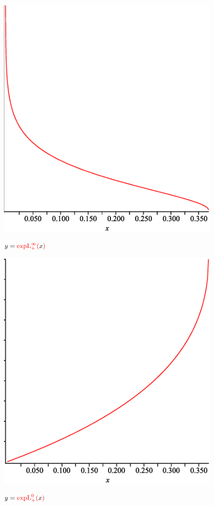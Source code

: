 \documentclass[12pt,reqno,intlimits,twoside]{amsart}
\DeclareMathOperator{\expL}{expL}%
\begin{document}
\begin{figure}[!h]
  \includegraphics{ExpLinPosInfinity}\\
  \caption{$y=\textcolor{red}{\expL_+^{\infty}(}x\textcolor{red}{)}$}\label{FigExpLinPosInfinity}
\end{figure}

\newpage

\begin{figure}[!h]
  \includegraphics{ExpLinPosZero}\\
  \caption{$y=\textcolor{red}{\expL_+^{0}(}x\textcolor{red}{)}$}\label{FigExpLinPosZero}
\end{figure}
\end{document}
